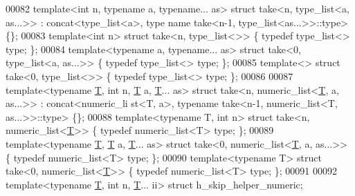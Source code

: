 \begin{DoxyCode}
00082 \textcolor{keyword}{template}<\textcolor{keywordtype}{int} n, \textcolor{keyword}{typename} a, \textcolor{keyword}{typename}... as> \textcolor{keyword}{struct }take<n, type\_list<a, as...>> : concat<type\_list<a>, type
      name take<n-1, type\_list<as...>>::type> \{\};
00083 \textcolor{keyword}{template}<\textcolor{keywordtype}{int} n>                             \textcolor{keyword}{struct }take<n, type\_list<>>         \{ \textcolor{keyword}{typedef} type\_list<> type;
       \};
00084 \textcolor{keyword}{template}<\textcolor{keyword}{typename} a, \textcolor{keyword}{typename}... as>        \textcolor{keyword}{struct }take<0, type\_list<a, as...>> \{ \textcolor{keyword}{typedef} type\_list<> type;
       \};
00085 \textcolor{keyword}{template}<>                                  \textcolor{keyword}{struct }take<0, type\_list<>>         \{ \textcolor{keyword}{typedef} type\_list<> type;
       \};
00086 
00087 \textcolor{keyword}{template}<\textcolor{keyword}{typename} \hyperlink{group___sparse_core___module_class_eigen_1_1_triplet}{T}, \textcolor{keywordtype}{int} n, \hyperlink{group___sparse_core___module_class_eigen_1_1_triplet}{T} a, \hyperlink{group___sparse_core___module_class_eigen_1_1_triplet}{T}... as> \textcolor{keyword}{struct }take<n, numeric\_list<\hyperlink{group___sparse_core___module_class_eigen_1_1_triplet}{T}, a, as...>> : concat<numeric\_li
      st<T, a>, typename take<n-1, numeric\_list<T, as...>>::type> \{\};
00088 \textcolor{keyword}{template}<\textcolor{keyword}{typename} T, \textcolor{keywordtype}{int} n>               \textcolor{keyword}{struct }take<n, numeric\_list<\hyperlink{group___sparse_core___module_class_eigen_1_1_triplet}{T}>>           \{ \textcolor{keyword}{typedef} 
      numeric\_list<T> type; \};
00089 \textcolor{keyword}{template}<\textcolor{keyword}{typename} \hyperlink{group___sparse_core___module_class_eigen_1_1_triplet}{T}, \hyperlink{group___sparse_core___module_class_eigen_1_1_triplet}{T} a, \hyperlink{group___sparse_core___module_class_eigen_1_1_triplet}{T}... as>        \textcolor{keyword}{struct }take<0, numeric\_list<\hyperlink{group___sparse_core___module_class_eigen_1_1_triplet}{T}, a, as...>> \{ \textcolor{keyword}{typedef} 
      numeric\_list<T> type; \};
00090 \textcolor{keyword}{template}<\textcolor{keyword}{typename} T>                      \textcolor{keyword}{struct }take<0, numeric\_list<\hyperlink{group___sparse_core___module_class_eigen_1_1_triplet}{T}>>           \{ \textcolor{keyword}{typedef} 
      numeric\_list<T> type; \};
00091 
00092 \textcolor{keyword}{template}<\textcolor{keyword}{typename} \hyperlink{group___sparse_core___module_class_eigen_1_1_triplet}{T}, \textcolor{keywordtype}{int} n, \hyperlink{group___sparse_core___module_class_eigen_1_1_triplet}{T}... ii>      \textcolor{keyword}{struct }h\_skip\_helper\_numeric;

\end{DoxyCode}
